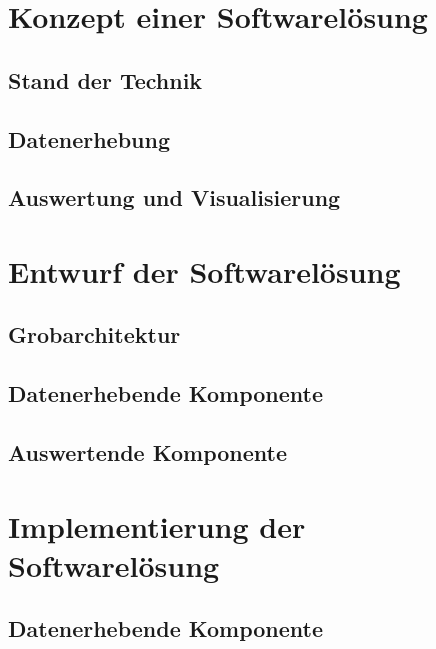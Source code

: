 \documentclass[oneside, ngerman, final, 11pt, a4paper, 1.1headlines, headinclude=false, footinclude=false, mpinclude=false, pagesize, onecolumn, titlepage, parskip=half, headsepline, chapterprefix=false, version=first, listof=totoc, bibliography=totoc, toc=graduated, fleqn, twoside=true]{scrbook}
\begin{document}
	\textit{\lipsum[1-3]}
	
	\chapter{Konzept einer Softwarelösung}
	
		\section{Stand der Technik}
		\textit{\lipsum[1]}
		
		\section{Datenerhebung}
		\textit{\lipsum[1]}
		
		\section{Auswertung und Visualisierung}
		\textit{\lipsum[1]}
	
	\chapter{Entwurf der Softwarelösung}
		
		\section{Grobarchitektur}
		\textit{\lipsum[1]}
	
		\section{Datenerhebende Komponente}
		\textit{\lipsum[1]}
		
		\section{Auswertende Komponente}
		\textit{\lipsum[1]}
	
	\chapter{Implementierung der Softwarelösung}
	
		\section{Datenerhebende Komponente}
		\textit{\lipsum[1]}
		
\end{document}
